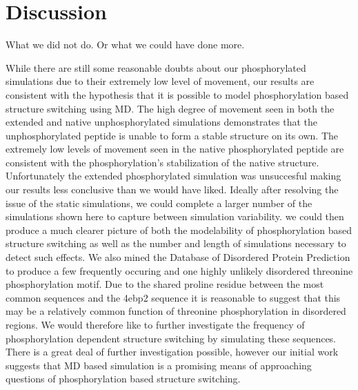 \section{Discussion} %
\label{sec:discussion}

What we did not do. Or what we could have done more.

While there are still some reasonable doubts about our phosphorylated simulations due to their extremely low level of movement, our results are consistent with the hypothesis that it is possible to model phosphorylation based structure switching using MD.
 The high degree of movement seen in both the extended and native unphosphorylated simulations demonstrates that the unphosphorylated peptide is unable to form a stable structure on its own.
 The extremely low levels of movement seen in the native phosphorylated peptide are consistent with the phosphorylation's stabilization of the native structure.
 Unfortunately the extended phosphorylated simulation was unsuccesful making our results less conclusive than we would have liked.
 Ideally after resolving the issue of the static simulations, we could complete a larger number of the simulations shown here to capture between simulation variability.
 we could then produce a much clearer picture of both the modelability of phosphorylation based structure switching as well as the number and length of simulations necessary to detect such effects.
 We also mined the Database of Disordered Protein Prediction to produce a few frequently occuring and one highly unlikely disordered threonine phosphorylation motif.
Due to the shared proline residue between the most common sequences and the 4ebp2 sequence it is reasonable to suggest that this may be a relatively common function of threonine phosphorylation in disordered regions.
We would therefore like to further investigate the frequency of phosphorylation dependent structure switching by simulating these sequences.
 There is a great deal of further investigation possible, however our initial work suggests that MD based simulation is a promising means of approaching questions of phosphorylation based structure switching. 


